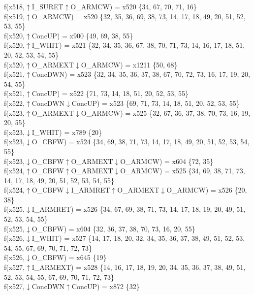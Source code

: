 f(x518,$\uparrow$I\_SURET$\uparrow$O\_ARMCW) = x520 \{34, 67, 70, 71, 16\} \\  
f(x519,$\uparrow$O\_ARMCW) = x520 \{32, 35, 36, 69, 38, 73, 14, 17, 18, 49, 20, 51, 52, 53, 55\} \\  
f(x520,$\uparrow$ConcUP) = x900 \{49, 69, 38, 55\} \\  
f(x520,$\uparrow$I\_WHIT) = x521 \{32, 34, 35, 36, 67, 38, 70, 71, 73, 14, 16, 17, 18, 51, 20, 52, 53, 54, 55\} \\  
f(x520,$\uparrow$O\_ARMEXT$\downarrow$O\_ARMCW) = x1211 \{50, 68\} \\  
f(x521,$\uparrow$ConcDWN) = x523 \{32, 34, 35, 36, 37, 38, 67, 70, 72, 73, 16, 17, 19, 20, 54, 55\} \\  
f(x521,$\uparrow$ConcUP) = x522 \{71, 73, 14, 18, 51, 20, 52, 53, 55\} \\  
f(x522,$\uparrow$ConcDWN$\downarrow$ConcUP) = x523 \{69, 71, 73, 14, 18, 51, 20, 52, 53, 55\} \\  
f(x523,$\uparrow$O\_ARMEXT$\downarrow$O\_ARMCW) = x525 \{32, 67, 36, 37, 38, 70, 73, 16, 19, 20, 55\} \\  
f(x523,$\downarrow$I\_WHIT) = x789 \{20\} \\  
f(x523,$\downarrow$O\_CBFW) = x524 \{34, 69, 38, 71, 73, 14, 17, 18, 49, 20, 51, 52, 53, 54, 55\} \\  
f(x523,$\downarrow$O\_CBFW$\uparrow$O\_ARMEXT$\downarrow$O\_ARMCW) = x604 \{72, 35\} \\  
f(x524,$\uparrow$O\_CBFW$\uparrow$O\_ARMEXT$\downarrow$O\_ARMCW) = x525 \{34, 69, 38, 71, 73, 14, 17, 18, 49, 20, 51, 52, 53, 54, 55\} \\  
f(x524,$\uparrow$O\_CBFW$\downarrow$I\_ARMRET$\uparrow$O\_ARMEXT$\downarrow$O\_ARMCW) = x526 \{20, 38\} \\  
f(x525,$\downarrow$I\_ARMRET) = x526 \{34, 67, 69, 38, 71, 73, 14, 17, 18, 19, 20, 49, 51, 52, 53, 54, 55\} \\  
f(x525,$\downarrow$O\_CBFW) = x604 \{32, 36, 37, 38, 70, 73, 16, 20, 55\} \\  
f(x526,$\downarrow$I\_WHIT) = x527 \{14, 17, 18, 20, 32, 34, 35, 36, 37, 38, 49, 51, 52, 53, 54, 55, 67, 69, 70, 71, 72, 73\} \\  
f(x526,$\downarrow$O\_CBFW) = x645 \{19\} \\  
f(x527,$\uparrow$I\_ARMEXT) = x528 \{14, 16, 17, 18, 19, 20, 34, 35, 36, 37, 38, 49, 51, 52, 53, 54, 55, 67, 69, 70, 71, 72, 73\} \\  
f(x527,$\downarrow$ConcDWN$\uparrow$ConcUP) = x872 \{32\} \\  
